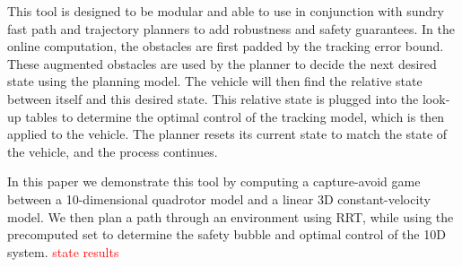 This tool is designed to be modular and able to use in conjunction with sundry fast path and trajectory planners to add robustness and safety guarantees. In the online computation, the obstacles are first padded by the tracking error bound. These augmented obstacles are used by the planner to decide the next desired state using the planning model. The vehicle will then find the relative state between itself and this desired state. This relative state is plugged into the look-up tables to determine the optimal control of the tracking model, which is then applied to the vehicle. The planner resets its current state to match the state of the vehicle, and the process continues.

In this paper we demonstrate this tool by computing a capture-avoid game between a 10-dimensional quadrotor model and a linear 3D constant-velocity model. We then plan a path through an environment using RRT, while using the precomputed set to determine the safety bubble and optimal control of the 10D system. \textcolor{red}{state results}